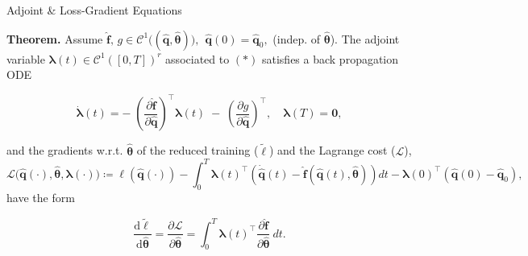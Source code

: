 \begin{frame}{Adjoint \& Loss-Gradient Equations}
    
\textbf{Theorem.} Assume $\hat{\mathbf{f}},\,g \in \mathcal{C}^1\bigl((\hat{\mathbf{q}},\hat{\bm{\theta}})\bigr), ~~
\hat{\mathbf{q}}(0)=\hat{\mathbf{q}}_0,$ (indep. of $\hat{\bm{\theta}}$). The \textcolor{codeblue}{adjoint variable} $\bm{\lambda}(t)\in\mathcal{C}^1([0,T])^r$ associated to $\bm{(*)}$ satisfies a back propagation ODE
\begin{center}
\begin{tcolorbox}[width=11cm, colback=gray!10, colframe=gray!50, boxrule=0.5pt, arc=2pt]
\begin{equation*}
        \dot{\bm{\lambda}}(t) = -\;\left(\dfrac{\partial \hat{\mathbf{f}}}{\partial \hat{\mathbf{q}}}\right)^{\top}\bm{\lambda}(t)\;-\; \left(\dfrac{\partial g}{\partial \hat{\mathbf{q}}}\right)^{\top} ,\quad\bm{\lambda}(T)=\bm{0},
        \label{eq:adjoint_eqs}
\end{equation*}
\end{tcolorbox}\end{center}
and the \textcolor{codeblue}{gradients} w.r.t. $\hat{\bm{\theta}}$ of the reduced training ($\tilde\ell$) and the Lagrange cost ($\mathscr{L}$),
\begin{equation*}
        \mathscr{L}\bigl(\hat{\mathbf{q}}(\cdot),\hat{\bm{\theta}},\bm{\lambda}(\cdot)\bigr) \coloneqq \ell(\hat{\mathbf{q}}(\cdot)) - \int_0^T \bm{\lambda}(t)^{\top}\left( \dot{\hat{\mathbf{q}}}(t)-\hat{\mathbf{f}}(\hat{\mathbf{q}}(t),\hat{\bm{\theta}}) \right)dt - \bm{\lambda}(0)^{\top}(\hat{\mathbf{q}}(0)-\hat{\mathbf{q}}_0),
        \label{eq:lagrange_cost2}
\end{equation*}
have the form
\vspace{-0.6cm}
\begin{center}
\begin{tcolorbox}[width=7.7cm, colback=gray!10, colframe=gray!50, boxrule=0.5pt, arc=2pt]
\begin{equation*}
        \dfrac{\mathrm{d} \tilde{\ell}}{\mathrm{d} \hat{\bm{\theta}}} = \dfrac{\partial \mathscr{L}}{\partial\hat{\bm{\theta}}} = \int_0^T \bm{\lambda}(t)^{\top}\dfrac{\partial\hat{\mathbf{f}}}{\partial\hat{\bm{\theta}}}~dt.
        \label{eq:gradient_lagrange}
\end{equation*}
\end{tcolorbox}\end{center}
    
\end{frame}

